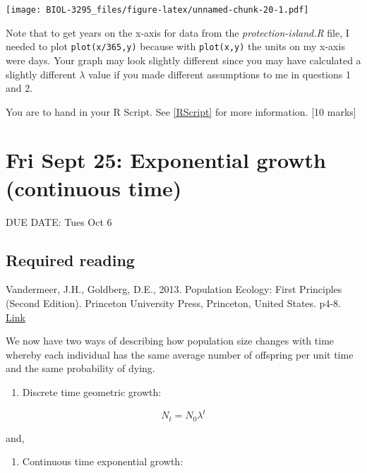 \documentclass[]{book}
\providecommand{\tightlist}{%
  \setlength{\itemsep}{0pt}\setlength{\parskip}{0pt}}
\begin{document}
\texttt{[image: BIOL-3295\_files/figure-latex/unnamed-chunk-20-1.pdf]}

Note that to get years on the x-axis for data from the
\emph{protection-island.R} file, I needed to plot \texttt{plot(x/365,y)}
because with \texttt{plot(x,y)} the units on my x-axis were days. Your
graph may look slightly different since you may have calculated a
slightly different \(\lambda\) value if you made different assumptions
to me in questions 1 and 2.

You are to hand in your R Script. See \ref{RScript} for more
information. {[}10 marks{]}

\chapter{Fri Sept 25: Exponential growth (continuous
time)}\label{fri-sept-25-exponential-growth-continuous-time}

DUE DATE: Tues Oct 6

\section{Required reading}\label{required-reading-2}

Vandermeer, J.H., Goldberg, D.E., 2013. Population Ecology: First
Principles (Second Edition). Princeton University Press, Princeton,
United States. p4-8.
\href{https://ebookcentral-proquest-com.qe2a-proxy.mun.ca/lib/mun/detail.action?docID=1205619}{Link}

We now have two ways of describing how population size changes with time
whereby each individual has the same average number of offspring per
unit time and the same probability of dying.

\begin{enumerate}
\def\labelenumi{\arabic{enumi})}
\tightlist
\item
  Discrete time geometric growth:
\end{enumerate}

\begin{equation}
N_t = N_0\lambda^t
\label{eq:Geo}
\end{equation}

and,

\begin{enumerate}
\def\labelenumi{\arabic{enumi})}
\setcounter{enumi}{1}
\tightlist
\item
  Continuous time exponential growth:
\end{enumerate}
\end{document}
